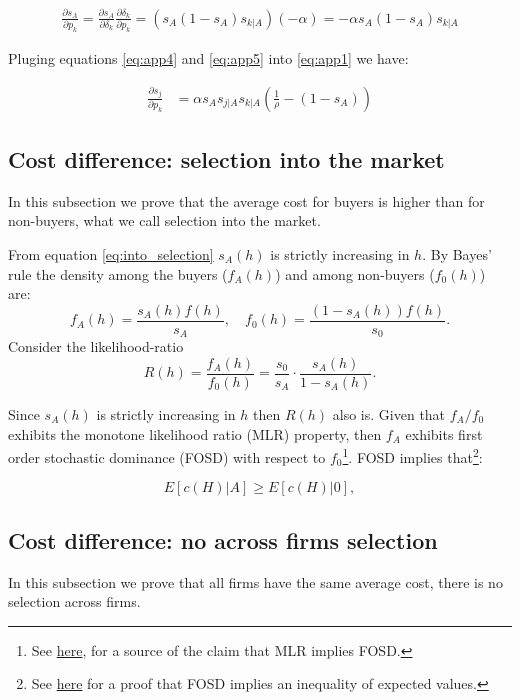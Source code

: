 \documentclass[12pt]{article}
\theoremstyle{plain}
\theoremstyle{plain}
\begin{document}
\begin{align}\label{eq:app5}
    \frac{\partial s_A}{\partial p_k} = \frac{\partial s_A}{\partial \delta_k}\frac{\partial \delta_k}{\partial p_k} = (s_A(1-s_A)s_{k|A})(-\alpha) = -\alpha s_A(1-s_A)s_{k|A}    
\end{align}

Pluging equations \ref{eq:app4} and \ref{eq:app5} into \ref{eq:app1} we have: 


\begin{align}\label{eq:app6}
    \frac{\partial s_j}{\partial p_k} 
    &= \alpha s_A s_{j|A}s_{k|A}\left(\frac{1}{\rho}  - (1-s_A)\right)
\end{align}


\bigskip

\subsection{Cost difference: selection into the market}\label{sec:appendix2}
In this subsection we prove that the average cost for buyers is higher than for non-buyers, what we call selection into the market. 

From equation \ref{eq:into_selection} 
$s_A(h)$ is strictly increasing in $h$.  By Bayes' rule the density among the buyers ($f_A(h)$) and among non-buyers ($f_0(h)$) are: 
    $$f_A(h) = \frac{s_A(h)f(h)}{s_A}, \quad f_0(h) = \frac{(1-s_A(h))f(h)}{s_0}.$$
Consider the likelihood-ratio
    $$R(h) = \frac{f_A(h)}{f_0(h)} = \frac{s_0}{s_A} \cdot \frac{s_A(h)}{1-s_A(h)}.$$

Since $s_A(h)$ is strictly increasing in $h$ then $R(h)$ also is. 
Given that $f_A/f_0$ exhibits the monotone likelihood ratio (MLR) property, then $f_A$ exhibits first order stochastic dominance (FOSD) with respect to $f_0$\footnote{See  \href{https://en.wikipedia.org/wiki/Monotone_likelihood_ratio?utm_source=chatgpt.com}{here}, for a source of the claim that MLR implies FOSD.}. FOSD implies that\footnote{See \href{https://economics.stackexchange.com/questions/15134/implication-of-first-order-stochastic-dominance?utm_source=chatgpt.com}{here} for a proof that FOSD implies an inequality of expected values. }: 

$$E[c(H)|A] \geq E[c(H)|0],$$

\bigskip

\subsection{Cost difference: no across firms selection}\label{sec:appendix2.1}
In this subsection we prove that all firms have the same average cost, there is no selection across firms. 
\end{document}
